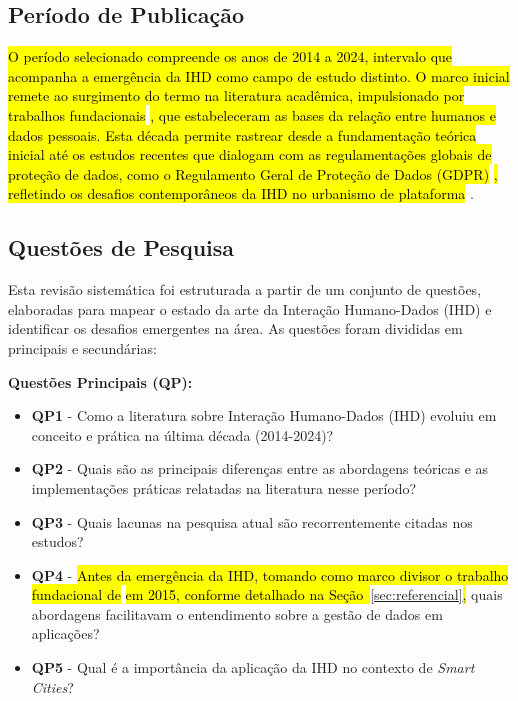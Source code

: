 \documentclass[12pt]{article}
\newcommand{\hlcite}[1]{\colorbox{yellow}{\cite{#1}}} %
\begin{document}

\subsection{Período de Publicação}

   \hl{O período selecionado compreende os anos de 2014 a 2024, intervalo que acompanha a emergência da IHD como campo de estudo distinto. O marco inicial remete ao surgimento do termo na literatura acadêmica, impulsionado por trabalhos fundacionais} \hlcite{mortier2015humandatainteractionhumanface,Hornung2015}\hl{, que estabeleceram as bases da relação entre humanos e dados pessoais. Esta década permite rastrear desde a fundamentação teórica inicial até os estudos recentes que dialogam com as regulamentações globais de proteção de dados, como o Regulamento Geral de Proteção de Dados (GDPR)} \cite{gdpr2016}\hl{, refletindo os desafios contemporâneos da IHD no urbanismo de plataforma} \hlcite{Belizario2023Interacao,chalhoub2024useful,coleti2024grandihc}.

\subsection{Questões de Pesquisa}

 Esta revisão sistemática foi estruturada a partir de um conjunto de questões, elaboradas para mapear o estado da arte da Interação Humano-Dados (IHD) e identificar os desafios emergentes na área. As questões foram divididas em principais e secundárias:

\textbf{Questões Principais (QP):}
\begin{itemize}
\item \textbf{QP1} - Como a literatura sobre Interação Humano-Dados (IHD) evoluiu em conceito e prática na última década (2014-2024)?
\item \textbf{QP2} - Quais são as principais diferenças entre as abordagens teóricas e as implementações práticas relatadas na literatura nesse período?
\item \textbf{QP3} - Quais lacunas na pesquisa atual são recorrentemente citadas nos estudos?
\item \textbf{QP4} - \hl{Antes da emergência da IHD, tomando como marco divisor o trabalho fundacional de} \hlcite{mortier2015humandatainteractionhumanface} \hl{em 2015, conforme detalhado na Seção~}\ref{sec:referencial}\hl{,} quais abordagens facilitavam o entendimento sobre a gestão de dados em aplicações?
\item \textbf{QP5} - Qual é a importância da aplicação da IHD no contexto de \textit{Smart Cities}?
\end{itemize}
\end{document}
